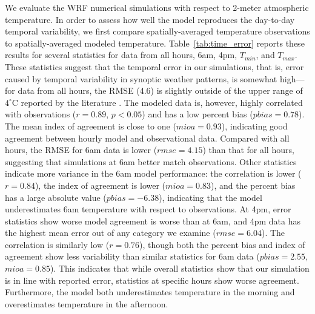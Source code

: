 \documentclass[draft,linenumbers]{agujournal}
\begin{document}
We evaluate the WRF numerical simulations with respect to 2-meter atmospheric temperature. In order to assess how well the model reproduces the day-to-day temporal variability, we first compare spatially-averaged temperature observations to spatially-averaged modeled temperature. 
Table~\ref{tab:time_error} reports these results for several statistics for data from all hours, 6am, 4pm, $T_{min}$, and $T_{max}$.  
These statistics suggest that the temporal error in our simulations, that is, error caused by temporal variability in synoptic weather patterns, is somewhat high---for data from all hours, the RMSE (4.6) is slightly outside of the upper range of $4^\circ$C reported by the literature \citep{kim2013evaluation}. 
The modeled data is, however, highly correlated with observations ($r=0.89$, $p<0.05$) and has a low percent bias ($pbias = 0.78$). The mean index of agreement is close to one ($mioa=0.93$), indicating good agreement between hourly model and observational data.
Compared with all hours, the RMSE for 6am data is lower ($rmse= 4.15$) than that for all hours, suggesting that simulations at 6am better match observations. 
Other statistics indicate more variance in the 6am model performance: the correlation is lower ($r=0.84$), the index of agreement is lower ($mioa=0.83$), and the percent bias has a large absolute value ($pbias=-6.38$), indicating that the model underestimates 6am temperature with respect to observations. 
%
At 4pm, error statistics show worse model agreement is worse than at 6am,  %
and 4pm data has the highest mean error out of any category we examine ($rmse=6.04$). The correlation is similarly low ($r=0.76$), though both the percent bias and index of agreement show less variability than similar statistics for 6am data ($pbias=2.55$, $mioa=0.85$). This indicates that while overall statistics show that our simulation is in line with reported error, statistics at specific hours show worse agreement. Furthermore, the model both underestimates temperature in the morning and overestimates temperature in the afternoon. %
\end{document}
